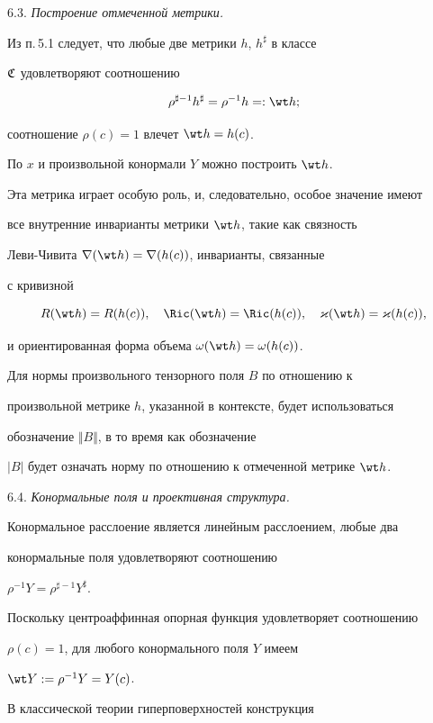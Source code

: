 6.3. {\it Построение отмеченной метрики.}

Из п.\,5.1 следует, что любые две метрики $h$, $h^\sharp$ в классе

$\frak C$ удовлетворяют соотношению

$$

\rho^{\sharp -1} h^{\sharp} = \rho^{-1} h =: \wt h;

$$

соотношение $\rho (c) = 1$ влечет $\wt h = h(c)$.

По $x$ и произвольной конормали $Y$ можно построить $\wt h$.

Эта метрика играет особую роль, и, следовательно, особое значение имеют

все внутренние инварианты метрики $\wt h$, такие как связность

Леви-Чивита $\nabla (\wt h) = \nabla (h(c))$, инварианты, связанные

с кривизной

$$

R(\wt h)= R(h(c)), \quad \Ric(\wt h)= \Ric(h(c)), \quad

\varkappa (\wt h) = \varkappa (h(c)),

$$

и ориентированная форма объема $\omega(\wt h) = \omega(h(c))$.

Для нормы произвольного тензорного поля $B$ по отношению к

произвольной метрике $h$, указанной в контексте, будет использоваться

обозначение $\Vert B \Vert $, в то время как обозначение

$|B|$ будет означать норму по отношению к отмеченной метрике $\wt h$.

\medskip





6.4. {\it Конормальные поля и проективная структура.}

Конормальное расслоение является линейным расслоением, любые два

конормальные поля удовлетворяют соотношению

$\rho^{-1}Y = \rho^{\sharp-1}Y^\sharp$.

Поскольку центроаффинная опорная функция удовлетворяет соотношению

$\rho (c) = 1$, для любого конормального поля $Y$ имеем

$\wt Y := \rho^{-1}Y = Y(c)$.

В классической теории гиперповерхностей конструкция

